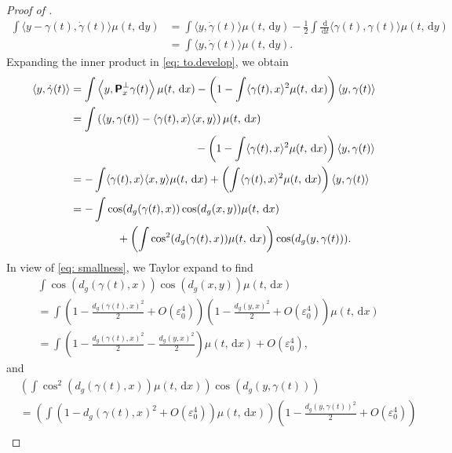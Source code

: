 \documentclass[a4paper,11pt]{article}
\theoremstyle{plain}
\newcommand{\proj}{\bm{\mathsf{P}}^\perp}
\newcommand{\diff}{\, \mathrm{d}}
\numberwithin{equation}{section}
\begin{document}
\begin{proof}[Proof of ]
 \begin{align}
     \int \langle y-\gamma(t),\dot{\gamma}(t)\rangle \mu(t,\diff y)&=\int \langle y,\dot{\gamma}(t)\rangle \mu(t,\diff y)-\frac{1}{2}\int \frac{\diff}{\diff t}\langle \gamma(t),\gamma(t)\rangle \mu(t,\diff y) \nonumber\\
     &=\int \langle y,\dot{\gamma}(t)\rangle \mu(t,\diff y).\label{eq: to.develop}  \end{align}
Expanding the inner product in \eqref{eq: to.develop}, we obtain
\begin{align}
    \langle y,\dot{\gamma}(t)\rangle&=\int\left\langle y,\proj_x\gamma(t)\right\rangle\mu(t,\diff x)-\left(1-\int \langle \gamma(t),x\rangle^2\mu(t,\diff x)\right) \langle y,\gamma(t)\rangle\nonumber\\
    &=\int\left(\langle y,\gamma(t)\rangle -\langle \gamma(t),x\rangle \langle x,y\rangle\right) \mu(t,\diff x)
    \nonumber\\
    &\hspace{4cm}-\left(1-\int \langle \gamma(t),x\rangle^2\mu(t,\diff x)\right) \langle y,\gamma(t)\rangle\nonumber\\
    &=-\int \langle \gamma(t),x\rangle \langle x,y\rangle \mu(t,\diff x)+\left(\int \langle \gamma(t),x\rangle^2\mu(t,\diff x)\right) \langle y,\gamma(t)\rangle\nonumber\\
    &=-\int  \cos(d_g(\gamma(t),x)) \cos(d_g(x,y)) \mu(t,\diff x)\nonumber\\
    &\hspace{1.5cm}+\left(\int \cos^2(d_g(\gamma(t),x))\mu(t,\diff x)\right) \cos(d_g(y,\gamma(t))).\label{eq: several.cosines}
\end{align}
In view of \eqref{eq: smallness}, we Taylor expand to find
\begin{align}
    &\int  \cos(d_g(\gamma(t),x) )\cos(d_g(x,y)) \mu(t,\diff x)\nonumber\\
    &=\int \left(1-\frac{d_g(\gamma(t),x)^2}{2}+O\left(\varepsilon_0^4\right)\right)\left(1-\frac{d_g(y,x)^2}{2}+O\left(\varepsilon_0^4\right)\right)\mu(t,\diff x)\nonumber\\
    &=\int \left(1-\frac{d_g(\gamma(t),x)^2}{2}-\frac{d_g(y,x)^2}{2}\right)\mu(t,\diff x)+O\left(\varepsilon_0^4\right),\label{eq: first.first.term}
\end{align}
and
\begin{align}
    &\left(\int \cos^2(d_g(\gamma(t),x))\mu(t,\diff x)\right) \cos(d_g(y,\gamma(t)))\nonumber\\
    &=\left(\int \left(1-d_g(\gamma(t),x)^2+O\left(\varepsilon_0^4\right)\right)\mu(t,\diff x)\right) \left(1-\frac{d_g(y,\gamma(t))^2}{2}+O\left(\varepsilon_0^4\right)\right)\nonumber\\

\end{align}
\end{proof}
\end{document}
